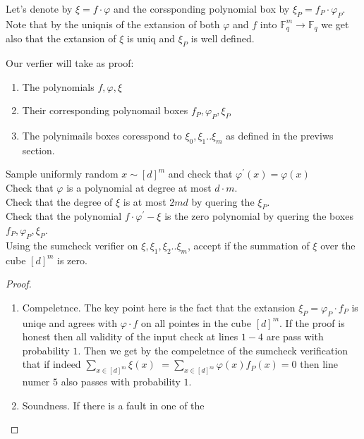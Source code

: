 \documentclass{article}
\newcommand{\FF}{\mathbb{F}_{q}}
\begin{document}
Let's denote by $\xi = f\cdot\varphi$ and the corssponding polynomial box by $\xi_{P} = f_{P} \cdot \varphi_{P}$. Note that by the uniqnis of the extansion of both $\varphi$ and $f$ into $\FF^{m}\rightarrow \FF$ we get also that the extansion of $\xi$ is uniq and $\xi_{P}$ is well defined.  

Our verfier will take as proof: 

\begin{enumerate}
  \item The polynomials $f,\varphi, \xi$ 
  \item Their corresponding polynomail boxes $f_{P},\varphi_{P}, \xi_{P}$ 
  \item The polynimails boxes coresspond to $\xi_{0}, \xi_{1} .. \xi_{m}$ as defined in the previws section.  
\end{enumerate}

\begin{algorithm}[H]
  Sample uniformly random $x \sim  [d]^{m}$ and check that $\varphi^{\prime}\left( x \right) = \varphi\left( x \right)$   \\
  Check that $\varphi$ is a polynomial at degree at most $d\cdot m$. \\
  Check that the degree of $\xi$ is at most $2md$ by quering the $\xi_{P}$.\\ 
  Check that the polynomial $f\cdot \varphi^{\prime} - \xi$ is the zero polynomial by quering the boxes $f_{P},\varphi_{P},\xi_{P}$. \\
  Using the sumcheck verifier on $\xi, \xi_{1},\xi_{2} .. \xi_{m}$, accept if the summation of $\xi$ over the cube $[d]^{m}$ is zero.  
\end{algorithm}

\begin{proof} \ 


  \begin{enumerate}
    \item Compeletnce. The key point here is the fact that the extansion $\xi_{P} = \varphi_{P} \cdot f_{P}$ is uniqe and agrees with $\varphi\cdot f$ on all pointes in the cube $[d]^{m}$. If the proof is honest then all validity of the input check at lines $1-4$ are pass with probability $1$. Then we get by the compeletnce of the sumcheck verification that if indeed $\sum_{x \in [d]^{m}}{ \xi(x) }$ $ = \sum_{x \in [d]^{m}}{ \varphi(x)f_{P}(x) } = 0$ then line numer $5$ also passes with probability $1$. 
    \item Soundness. If there is a fault in one of the  
  \end{enumerate}
\end{proof}
\end{document}

